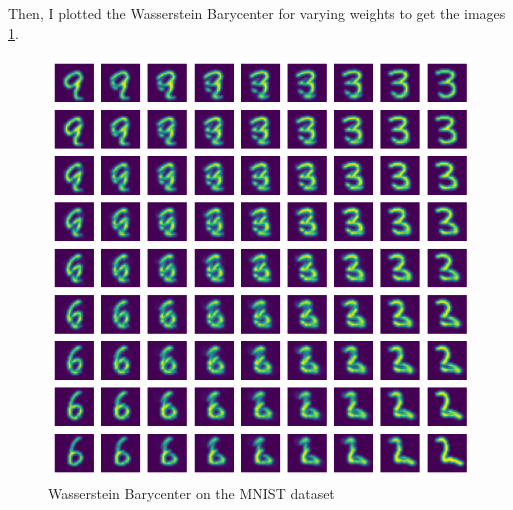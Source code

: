 \documentclass[a4paper,11pt]{article}
\begin{document}
Then, I plotted the Wasserstein Barycenter for varying weights to get the images \ref{fig:mnist}.
\begin{figure}
    \centering
    \includegraphics[width=0.75\linewidth]{image/MNIST_barycenter.png}
    \caption{Wasserstein Barycenter on the MNIST dataset}
    \label{fig:mnist}
\end{figure}

\newpage
\printbibliography
\end{document}
